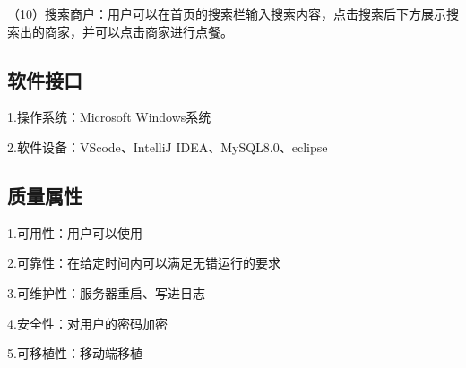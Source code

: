 （10）搜索商户：用户可以在首页的搜索栏输入搜索内容，点击搜索后下方展示搜索出的商家，并可以点击商家进行点餐。

\subsection{软件接口}

1.操作系统：Microsoft Windows系统

2.软件设备：VScode、IntelliJ IDEA、MySQL8.0、eclipse

\subsection{质量属性}

1.可用性：用户可以使用

2.可靠性：在给定时间内可以满足无错运行的要求

3.可维护性：服务器重启、写进日志

4.安全性：对用户的密码加密

5.可移植性：移动端移植



